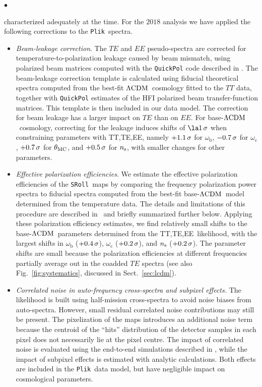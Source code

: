 \documentclass[longauth,traditabstract]{aa}
\def\,{\thinspace}
\newenvironment{unindentedlist}{
 \begin{list}{{$\bullet$}}{
  \setlength\partopsep{0pt}
  \setlength\parskip{0pt}
  \setlength\parsep{0pt}
  \setlength\topsep{0pt}
  \setlength\itemsep{0pt}
  \setlength{\itemindent}{\leftmargin}
  \setlength{\leftmargin}{0pt}
 }
}{
 \end{list}
}
\newcommand{\sroll}{\texttt{SRoll}}
\newcommand{\plik}{{\tt Plik}}
\newcommand{\mksym}[1]{\ifmmode {\rm #1}\else #1\fi}
\newcommand{\TTTEEE}{\mksym{TT,TE,EE}}
\newcommand{\ns}{n_{\rm s}}
\providecommand{\omb}{\omega_{\mathrm{b}}}
\providecommand{\omc}{\omega_{\mathrm{c}}}
\providecommand{\LCDM}{{$\rm{\Lambda CDM}$}}
\newcommand{\likeIII}{\citetalias{planck2016-l05}}
\begin{document}
\begin{unindentedlist}
characterized adequately at the time. For the $2018$ analysis we have applied the following corrections to the \plik\ spectra.
\begin{itemize}
\item \textit{Beam-leakage correction}. The $TE$ and $EE$ pseudo-spectra are corrected for temperature-to-polarization leakage caused by beam mismatch, using polarized beam matrices  computed with
the \texttt{QuickPol} code described in \citet{quickpolHivon}. The beam-leakage correction template is calculated using fiducial theoretical spectra computed from the best-fit \LCDM\ cosmology fitted to the $TT$ data,
together with \texttt{QuickPol} estimates of the
HFI polarized beam transfer-function matrices. This template is then included in our data model. The correction for beam leakage has a larger impact on $TE$ than on $EE$. For base-\LCDM\ cosmology, correcting for the leakage induces shifts of $\la 1\,\sigma$ when constraining parameters with \TTTEEE, namely $+1.1\,\sigma$ for $\omb$, $-0.7\,\sigma$ for $\omc$, $+0.7\,\sigma$ for $\theta_{\rm MC}$, and $+0.5\,\sigma$ for $\ns$, with smaller changes for other parameters.

\item \textit{Effective polarization efficiencies}.
We estimate the effective polarization efficiencies of the \sroll\ maps by comparing the frequency polarization power spectra to
fiducial spectra computed from the best-fit base-\LCDM\ model determined from the temperature data.
The details and limitations of this procedure are described in \likeIII\ and briefly summarized further below. Applying these polarization efficiency estimates, we find relatively small shifts to the base-\LCDM\ parameters determined from the
\TTTEEE\ likelihood, with the largest shifts in $\omb$ ($+0.4\,\sigma$), $\omc$ ($+0.2\,\sigma$), and $\ns$ ($+0.2\,\sigma$).
The parameter shifts are small because the
polarization efficiencies at different frequencies partially average out in the
coadded $TE$ spectra (see also Fig.~\ref{fig:systematics}, discussed in
Sect.~\ref{sec:lcdm}).

\item \textit{Correlated noise in auto-frequency cross-spectra and subpixel effects.}
The likelihood is built using half-mission cross-spectra to avoid noise biases from auto-spectra. However, small residual correlated noise contributions may still be present. The pixelization of the maps introduces an additional noise term because
the centroid of the ``hits'' distribution of the detector samples in each pixel does not necessarily lie at the pixel centre.
The impact of correlated noise is evaluated using the end-to-end simulations described in \citet{planck2016-l03},
 while the impact of subpixel effects is estimated with analytic calculations.
Both effects are included in the \plik\ data model, but have negligible impact on cosmological parameters.
\end{itemize}
\end{unindentedlist}
\end{document}
